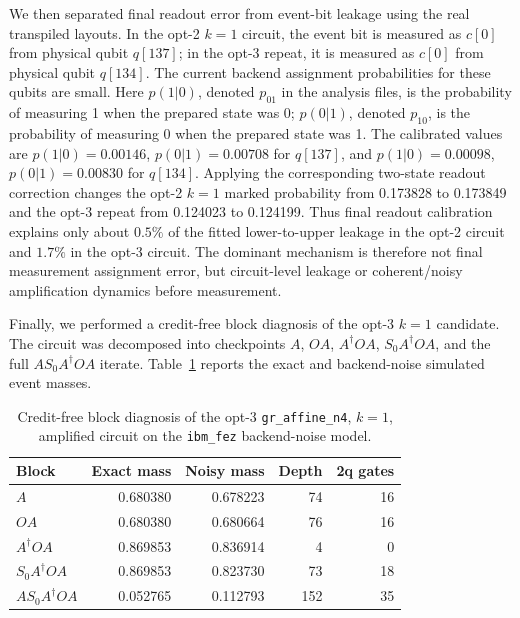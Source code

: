 We then separated final readout error from event-bit leakage using the real
transpiled layouts. In the opt-2 \(k=1\) circuit, the event bit is measured as
\(c[0]\) from physical qubit \(q[137]\); in the opt-3 repeat, it is measured as
\(c[0]\) from physical qubit \(q[134]\). The current backend assignment
probabilities for these qubits are small. Here \(p(1|0)\), denoted \(p_{01}\)
in the analysis files, is the probability of measuring 1 when the prepared
state was 0; \(p(0|1)\), denoted \(p_{10}\), is the probability of measuring 0
when the prepared state was 1. The calibrated values are
\(p(1|0)=0.00146\), \(p(0|1)=0.00708\) for \(q[137]\), and
\(p(1|0)=0.00098\), \(p(0|1)=0.00830\) for \(q[134]\). Applying the corresponding two-state
readout correction changes the opt-2 \(k=1\) marked probability from 0.173828
to 0.173849 and the opt-3 repeat from 0.124023 to 0.124199. Thus final readout
calibration explains only about \(0.5\%\) of the fitted lower-to-upper leakage
in the opt-2 circuit and \(1.7\%\) in the opt-3 circuit. The dominant mechanism
is therefore not final measurement assignment error, but circuit-level leakage
or coherent/noisy amplification dynamics before measurement.

Finally, we performed a credit-free block diagnosis of the opt-3 \(k=1\)
candidate. The circuit was decomposed into checkpoints \(A\), \(OA\),
\(A^\dagger OA\), \(S_0A^\dagger OA\), and the full
\(AS_0A^\dagger OA\) iterate. Table~\ref{tab:gr-affine-block-diagnosis}
reports the exact and backend-noise simulated event masses.

\begin{table}[h]
\centering
\begin{tabular}{lrrrr}
\toprule
Block & Exact mass & Noisy mass & Depth & 2q gates \\
\midrule
\(A\) & 0.680380 & 0.678223 & 74 & 16 \\
\(OA\) & 0.680380 & 0.680664 & 76 & 16 \\
\(A^\dagger OA\) & 0.869853 & 0.836914 & 4 & 0 \\
\(S_0A^\dagger OA\) & 0.869853 & 0.823730 & 73 & 18 \\
\(AS_0A^\dagger OA\) & 0.052765 & 0.112793 & 152 & 35 \\
\bottomrule
\end{tabular}
\caption{Credit-free block diagnosis of the opt-3 \texttt{gr\_affine\_n4},
\(k=1\), amplified circuit on the \texttt{ibm\_fez} backend-noise model.}
\label{tab:gr-affine-block-diagnosis}
\end{table}

